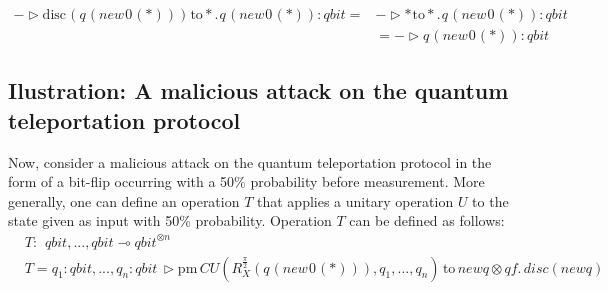 \begin{equation}
  \begin{split}
  - \triangleright \text{disc} \hspace{1pt} (q \hspace{1pt} (\textit{new}\hspace{1pt}0 \hspace{1pt}(*))) \hspace{1pt} \text{to} *. \hspace{1pt} q \hspace{1pt} (\textit{new}\hspace{1pt}0 \hspace{1pt}(*)): \textit{qbit} =& - \triangleright * \hspace{1pt} \text{to} *. \hspace{1pt} q \hspace{1pt} (\textit{new}\hspace{1pt}0 \hspace{1pt}(*)): \textit{qbit}\\
  & = - \triangleright q \hspace{1pt} (\textit{new}\hspace{1pt}0 \hspace{1pt}(*)): \textit{qbit} 
\end{split}
\end{equation}

\subsection{Ilustration: A malicious attack on the quantum teleportation protocol}

Now, consider a malicious attack on the quantum teleportation protocol in the form of a bit-flip occurring with a 50\% probability before measurement.   More generally,  one can define an operation $T$ that applies a unitary operation $U$ to the state given as input with 50\% probability. Operation $T$ can be defined as follows:
\begin{equation*}
\begin{split}
  &T: \hspace{5pt} \textit{qbit},...,\textit{qbit}  \multimap \textit{qbit}^{\otimes n} \\
  &T= q_{1}:\textit{qbit},...,q_{n}:\textit{qbit} \hspace{2pt}\triangleright \text{pm} \hspace{2pt} CU ( R_{X}^{\frac{\pi}{2}} (q \hspace{1pt} (\textit{new}\hspace{1pt}0 \hspace{1pt}(*))) ,q_{1},...,q_{n}) \hspace{2pt} \text{to} \hspace{2pt} newq \otimes qf. \hspace{2pt} \textit{disc} (newq) 
\end {split}
\end{equation*}


